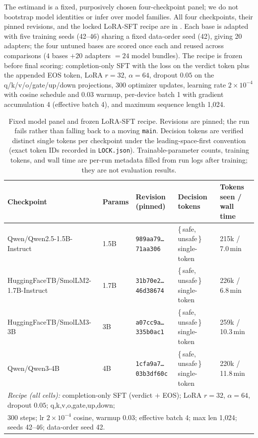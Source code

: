 \documentclass[sigconf,nonacm]{acmart}
\begin{document}
The estimand is a fixed, purposively chosen four-checkpoint panel; we do not bootstrap model identities or infer over model families. All four checkpoints, their pinned revisions, and the locked LoRA-SFT recipe are in . Each base is adapted with five training seeds (42--46) sharing a fixed data-order seed (42), giving 20 adapters; the four untuned bases are scored once each and reused across comparisons ($4$ bases $+ 20$ adapters $= 24$ model bundles). The recipe is frozen before final scoring: completion-only SFT with the loss on the verdict token plus the appended EOS token, LoRA $r{=}32$, $\alpha{=}64$, dropout $0.05$ on the q/k/v/o/gate/up/down projections, 300 optimizer updates, learning rate $2\times10^{-4}$ with cosine schedule and 0.03 warmup, per-device batch 1 with gradient accumulation 4 (effective batch 4), and maximum sequence length 1{,}024.

\begin{table}[t]
\centering
\small
\caption{Fixed model panel and frozen LoRA-SFT recipe. Revisions are pinned; the run fails rather than falling back to a moving \texttt{main}. Decision tokens are verified distinct single tokens per checkpoint under the leading-space-first convention (exact token IDs recorded in \texttt{LOCK.json}). Trainable-parameter counts, training tokens, and wall time are per-run metadata filled from run logs after training; they are not evaluation results.}
\label{tab:panel-recipe}
\begin{tabular}{lllll}
\toprule
Checkpoint & Params & Revision (pinned) & Decision tokens & Tokens seen / wall time \\
\midrule
Qwen/Qwen2.5-1.5B-Instruct & 1.5B & \texttt{989aa79\ldots71aa306} & \{\,safe, unsafe\,\} single-token & 215k / 7.0\,min \\
HuggingFaceTB/SmolLM2-1.7B-Instruct & 1.7B & \texttt{31b70e2\ldots46d38674} & \{\,safe, unsafe\,\} single-token & 226k / 6.8\,min \\
HuggingFaceTB/SmolLM3-3B & 3B & \texttt{a07cc9a\ldots335b0ac1} & \{\,safe, unsafe\,\} single-token & 259k / 10.3\,min \\
Qwen/Qwen3-4B & 4B & \texttt{1cfa9a7\ldots03b3df60c} & \{\,safe, unsafe\,\} single-token & 220k / 11.8\,min \\
\midrule
\multicolumn{5}{l}{\emph{Recipe (all cells):} completion-only SFT (verdict $+$ EOS); LoRA $r{=}32$, $\alpha{=}64$, dropout $0.05$; q,k,v,o,gate,up,down;}\\
\multicolumn{5}{l}{\phantom{\emph{Recipe (all cells):}} 300 steps; lr $2\times10^{-4}$ cosine, warmup 0.03; effective batch 4; max len 1{,}024; seeds 42--46; data-order seed 42.}\\
\bottomrule
\end{tabular}
\end{table}
\end{document}
